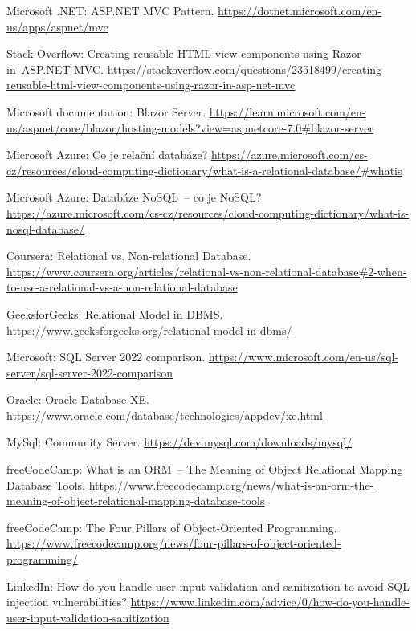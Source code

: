 \begin{thebibliography}{99}
Microsoft .NET: ASP.NET MVC Pattern.
\url{https://dotnet.microsoft.com/en-us/apps/aspnet/mvc}

Stack Overflow: Creating reusable HTML view components using Razor in~ASP.NET MVC.
\url{https://stackoverflow.com/questions/23518499/creating-reusable-html-view-components-using-razor-in-asp-net-mvc}

Microsoft documentation: Blazor Server.
\url{https://learn.microsoft.com/en-us/aspnet/core/blazor/hosting-models?view=aspnetcore-7.0\#blazor-server}

Microsoft Azure: Co je relační databáze?
\url{https://azure.microsoft.com/cs-cz/resources/cloud-computing-dictionary/what-is-a-relational-database/\#whatis}

Microsoft Azure: Databáze NoSQL~-- co je NoSQL?
\url{https://azure.microsoft.com/cs-cz/resources/cloud-computing-dictionary/what-is-nosql-database/}

Coursera: Relational vs. Non-relational Database.
\url{https://www.coursera.org/articles/relational-vs-non-relational-database#2-when-to-use-a-relational-vs-a-non-relational-database}

GeeksforGeeks: Relational Model in DBMS.
\url{https://www.geeksforgeeks.org/relational-model-in-dbms/}

Microsoft: SQL Server 2022 comparison.
\url{https://www.microsoft.com/en-us/sql-server/sql-server-2022-comparison}

Oracle: Oracle Database XE.
\url{https://www.oracle.com/database/technologies/appdev/xe.html}

MySql: Community Server.
\url{https://dev.mysql.com/downloads/mysql/}

freeCodeCamp: What is an ORM~-- The Meaning of Object Relational Mapping Database Tools.
\url{https://www.freecodecamp.org/news/what-is-an-orm-the-meaning-of-object-relational-mapping-database-tools}

freeCodeCamp: The Four Pillars of Object-Oriented Programming.
\url{https://www.freecodecamp.org/news/four-pillars-of-object-oriented-programming/}

LinkedIn: How do you handle user input validation and sanitization to avoid SQL injection vulnerabilities?
\url{https://www.linkedin.com/advice/0/how-do-you-handle-user-input-validation-sanitization}


\end{thebibliography}
